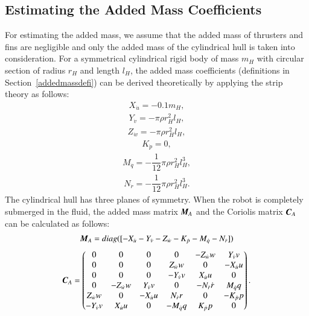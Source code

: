 \subsection{Estimating the Added Mass Coefficients}
For estimating the added mass, we assume that the added mass of thrusters and fins are negligible and only the added mass of the cylindrical hull is taken into consideration. For a symmetrical cylindrical rigid body of mass $m_{H}$ with circular section of radius $r_{H}$ and length $l_{H}$, the added mass coefficients (definitions in Section~\ref{addedmassdefi}) can be derived theoretically by applying the strip theory as follows:
\begin{align}
X_{\dot{u}}=-0.1m_{H},
\end{align}
\begin{align}
Y_{\dot{v}}=-\pi\rho r_{H}^{2}l_{H},
\end{align}
\begin{align}
Z_{\dot{w}}=-\pi\rho r_{H}^{2}l_{H},
\end{align}
\begin{align}
K_{\dot{p}}=0,
\end{align}
\begin{align}
M_{\dot{q}}=-\dfrac{1}{12}\pi\rho r_{H}^{2}l_{H}^{3},
\end{align}
\begin{align}
N_{\dot{r}}=-\dfrac{1}{12}\pi\rho r_{H}^{2}l_{H}^{3}.
\end{align}
The cylindrical hull has three planes of symmetry. When the robot is completely submerged in the fluid, the added mass matrix $\emph{\textbf{M}}_{A}$ and the Coriolis matrix $\emph{\textbf{C}}_{A}$ can be calculated as follows:
\begin{align}
\emph{\textbf{M}}_{A}=diag([-X_{\dot{u}} -Y_{\dot{v}} -Z_{\dot{w}}
-K_{\dot{p}} -M_{\dot{q}} -N_{\dot{r}}]) \label{EQ:AddedMassMatrix}
\end{align}
\begin{align}
\emph{\textbf{C}}_{A}=
\begin{pmatrix}
0&0&0&0&-Z_{\dot{w}}w&Y_{\dot{v}}v\\
0&0&0&Z_{\dot{w}}w&0&-X_{\dot{u}}u\\
0&0&0&-Y_{\dot{v}}v&X_{\dot{u}}u&0\\
0&-Z_{\dot{w}}w&Y_{\dot{v}}v&0&-N_{\dot{r}}\dot{r}&M_{\dot{q}}q\\
Z_{\dot{w}}w&0&-X_{\dot{u}}u&N_{\dot{r}}r&0&-K_{\dot{p}}p\\
-Y_{\dot{v}}v&X_{\dot{u}}u&0&-M_{\dot{q}}q&K_{\dot{p}}p&0
\end{pmatrix}. \label{EQ:CoriolisMatrix}
\end{align}

